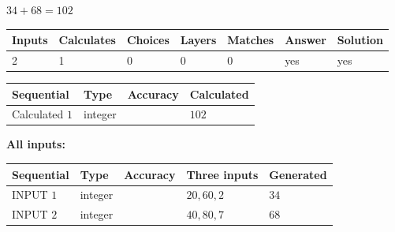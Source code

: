 \documentclass[12pt]{article}
\begin{document}
 
\noindent{}
 
 

 
 
 
\noindent{}
 
 

$ %
34 +  %
68=   %
102$
 
 
\noindent{}
 
 

 
   
   
   
   
\noindent\begin{tabular}{|l|l|l|l|l|l|l|}
 \hline
Inputs & Calculates & Choices & Layers & Matches & Answer & Solution \\ \hline
 2  & 
 1  & 
 0
  & 
 0  & 
 0  & 
  yes & 
  yes 
  \\ \hline
 \end{tabular}
   
   
   
   
\noindent{}
   
   
  
  
\noindent\begin{tabular}{|l|l|l|l|}
\hline
 Sequential & Type & Accuracy & Calculated \\ 
\hline
 
 
  Calculated $  1 $ & integer &  & 
  $ 102 $ 
 \\  \hline  
 \end{tabular}
   
   
   
   
\noindent\vspace{0.1in}\hspace{-0.08in} {\textbf{\Large{All inputs: }}}
   
   
  
  
\noindent\begin{tabular}{|l|l|l|l|l|}
\hline
 Sequential & Type & Accuracy & Three inputs & Generated \\ 
\hline
 
 
  INPUT $  1 $ & integer &  & $
 20
 , 
 60
 , 
 2
 $ & $ 34 $ 
 \\  \hline  
 
 
  INPUT $  2 $ & integer &  & $
 40
 , 
 80
 , 
 7
 $ & $ 68 $ 
 \\  \hline  
 \end{tabular}
   
\end{document}
